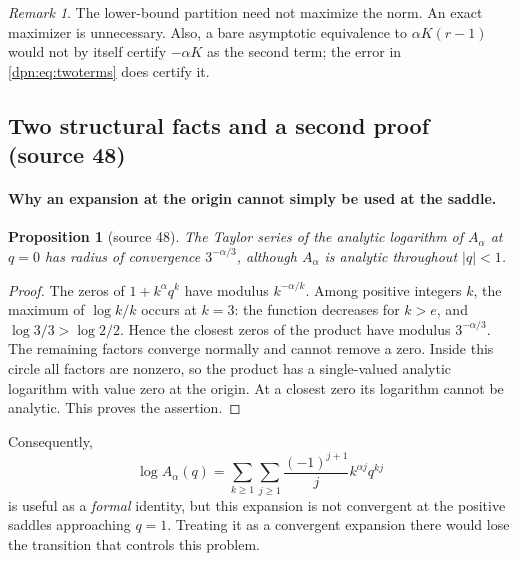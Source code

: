 \documentclass[11pt]{article}
\numberwithin{equation}{section}
\newtheorem{proposition}[theorem]{Proposition}
\theoremstyle{definition}\newtheorem{definition}[theorem]{Definition}
\theoremstyle{remark}\newtheorem{remark}[theorem]{Remark}
\newcommand{\src}[1]{\textup{(source #1)}}
\begin{document}
\begin{remark}
The lower-bound partition need not maximize the norm. An exact maximizer is
unnecessary. Also, a bare asymptotic equivalence to $\alpha K(r-1)$ would not
by itself certify $-\alpha K$ as the second term; the error in
\eqref{dpn:eq:twoterms} does certify it.
\end{remark}

\subsection{Two structural facts and a second proof \src{48}}\label{dpn:48:sec:elementary}

\paragraph{Why an expansion at the origin cannot simply be used at the saddle.}
\begin{proposition}[source 48]\label{dpn:48:prop:zeros}
The Taylor series of the analytic logarithm of $A_\alpha$ at $q=0$ has radius
of convergence $3^{-\alpha/3}$, although $A_\alpha$ is analytic throughout
$|q|<1$.
\end{proposition}
\begin{proof}
The zeros of $1+k^\alpha q^k$ have modulus $k^{-\alpha/k}$. Among positive
integers $k$, the maximum of $\log k/k$ occurs at $k=3$: the function
decreases for $k>e$, and $\log3/3>\log2/2$. Hence the closest zeros of the
product have modulus $3^{-\alpha/3}$. The remaining factors converge normally
and cannot remove a zero. Inside this circle all factors are nonzero, so the
product has a single-valued analytic logarithm with value zero at the origin.
At a closest zero its logarithm cannot be analytic. This proves the assertion.
\end{proof}
Consequently,
\[
 \log A_\alpha(q)=\sum_{k\ge1}\sum_{j\ge1}
          \frac{(-1)^{j+1}}{j}k^{\alpha j}q^{kj}
\]
is useful as a \emph{formal} identity, but this expansion is not convergent at
the positive saddles approaching $q=1$. Treating it as a convergent expansion
there would lose the transition that controls this problem.
\end{document}
